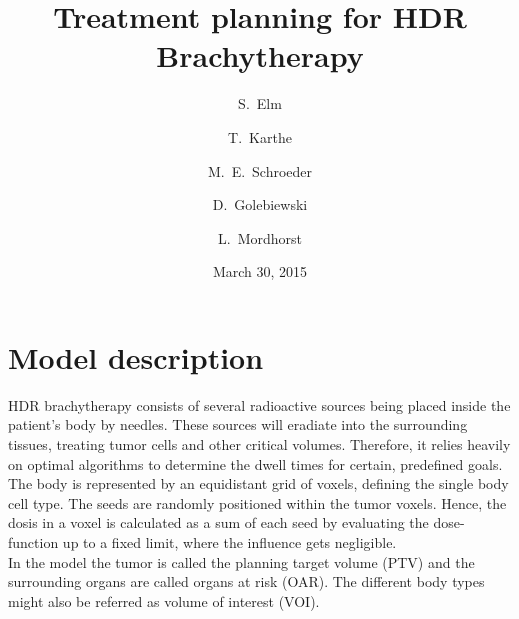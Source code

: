 \documentclass[12pt]{article}
\begin{document}
\title{Treatment planning for HDR Brachytherapy}
\date{March 30, 2015}
\author{S.~Elm \and
T.~Karthe \and
M.~E.~Schroeder \and
D.~Golebiewski \and
L.~Mordhorst}

\maketitle
\newpage


\tableofcontents

\section{Model description}
HDR brachytherapy consists of several radioactive sources being placed inside the patient's body by needles. These sources will eradiate into the surrounding tissues, treating tumor cells and other critical volumes. Therefore, it relies heavily on optimal algorithms to determine the dwell times for certain, predefined goals. \\
The body is represented by an equidistant grid of voxels, defining the single body cell type. The seeds are randomly positioned within the tumor voxels. Hence, the dosis in a voxel is calculated as a sum of each seed by evaluating the dose-function up to a fixed limit, where the influence gets negligible. \\
In the model the tumor is called the planning target volume (PTV) and the surrounding organs are called organs at risk (OAR). The different body types might also be referred as volume of interest (VOI).
\end{document}
